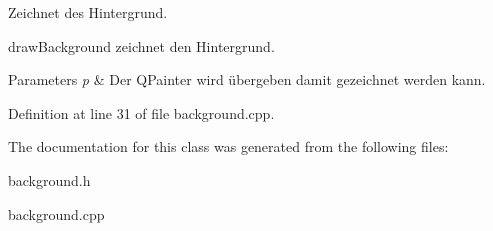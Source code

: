 Zeichnet des Hintergrund. 

draw\+Background zeichnet den Hintergrund. 
\begin{DoxyParams}{Parameters}
{\em p} & Der Q\+Painter wird übergeben damit gezeichnet werden kann. \\
\hline
\end{DoxyParams}


Definition at line 31 of file background.\+cpp.



The documentation for this class was generated from the following files\+:\begin{DoxyCompactItemize}
\item 
background.\+h\item 
background.\+cpp\end{DoxyCompactItemize}
